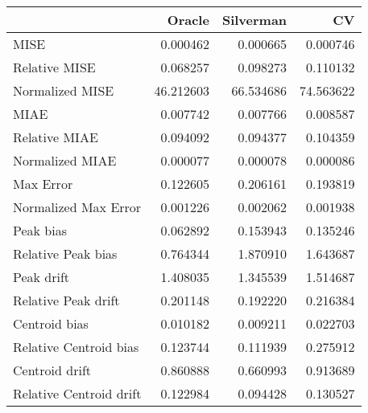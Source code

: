 \begin{tabular}{lrrr}
  \hline
 & Oracle & Silverman & CV \\ 
  \hline
MISE & 0.000462 & 0.000665 & 0.000746 \\ 
  Relative MISE & 0.068257 & 0.098273 & 0.110132 \\ 
  Normalized MISE & 46.212603 & 66.534686 & 74.563622 \\ 
  MIAE & 0.007742 & 0.007766 & 0.008587 \\ 
  Relative MIAE & 0.094092 & 0.094377 & 0.104359 \\ 
  Normalized MIAE & 0.000077 & 0.000078 & 0.000086 \\ 
  Max Error & 0.122605 & 0.206161 & 0.193819 \\ 
  Normalized Max Error & 0.001226 & 0.002062 & 0.001938 \\ 
  Peak bias & 0.062892 & 0.153943 & 0.135246 \\ 
  Relative Peak bias & 0.764344 & 1.870910 & 1.643687 \\ 
  Peak drift & 1.408035 & 1.345539 & 1.514687 \\ 
  Relative Peak drift & 0.201148 & 0.192220 & 0.216384 \\ 
  Centroid bias & 0.010182 & 0.009211 & 0.022703 \\ 
  Relative Centroid bias & 0.123744 & 0.111939 & 0.275912 \\ 
  Centroid drift & 0.860888 & 0.660993 & 0.913689 \\ 
  Relative Centroid drift & 0.122984 & 0.094428 & 0.130527 \\ 
   \hline
\end{tabular}
